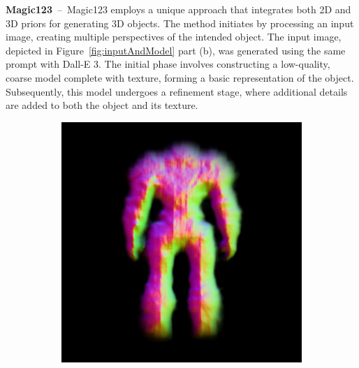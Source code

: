 \textbf{Magic123}~--~Magic123 employs a unique approach that integrates both 2D and 3D priors for generating 3D objects. The method initiates by processing an input image, creating multiple perspectives of the intended object. The input image, depicted in Figure~\ref{fig:inputAndModel} part (b), was generated using the same prompt with Dall-E 3. The initial phase involves constructing a low-quality, coarse model complete with texture, forming a basic representation of the object. Subsequently, this model undergoes a refinement stage, where additional details are added to both the object and its texture.

\begin{figure}[H]
    \centering
    \begin{subfigure}[b]{0.25\textwidth}
        \centering
        \fontsize{9pt}{7pt}\selectfont{}\vspace{.1cm}
        \includegraphics[width=\textwidth]{figures/generationProcess/magic123_coarse_robot_front_0_part2.png}

\end{subfigure}
\end{figure}
